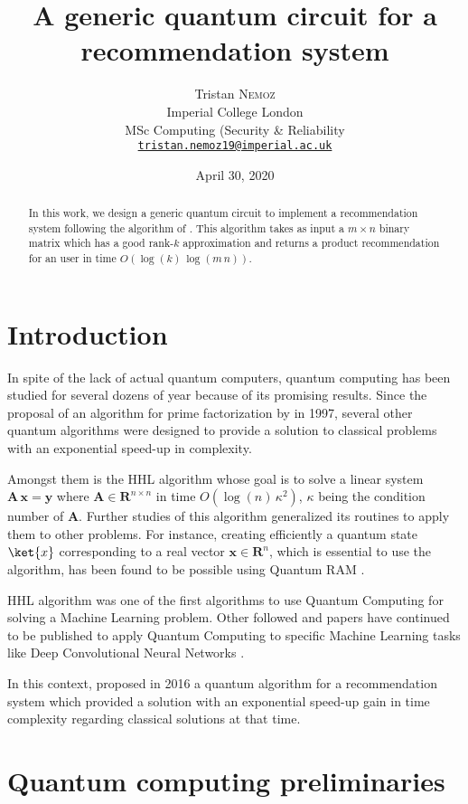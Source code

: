 \documentclass[11pt, a4paper]{article}
\date{April 30, 2020}
\author{Tristan \textsc{Nemoz}\\Imperial College London\\MSc Computing (Security \& Reliability\\\href{mailto:tristan.nemoz19@imperial.ac.uk}{\texttt{tristan.nemoz19@imperial.ac.uk}}}
\title{A generic quantum circuit for a recommendation system}
\begin{document}
	
	\maketitle
    \begin{abstract}
        In this work, we design a generic quantum circuit to implement a recommendation system following the algorithm of \citeauthor{QRS}. This algorithm takes as input a \(m\times n\) binary matrix which has a good rank-\(k\) approximation and returns a product recommendation for an user in time \(O(\log(k)\,\log(m\,n))\).
    \end{abstract}
    
    \section{Introduction}
        In spite of the lack of actual quantum computers, quantum computing has been studied for several dozens of year because of its promising results. Since the proposal of an algorithm for prime factorization \cite{Shor} by \citeauthor{Shor} in 1997, several other quantum algorithms were designed to provide a solution to classical problems with an exponential speed-up in complexity.
        
        Amongst them is the HHL algorithm \cite{HHL} whose goal is to solve a linear system \(\mathbf{A}\,\mathbf{x}=\mathbf{y}\) where \(\mathbf{A}\in\mathbf{R}^{n\times n}\) in time \(O\left(\log(n)\,\kappa^2\right)\), \(\kappa\) being the condition number of \(\mathbf{A}\). Further studies of this algorithm generalized its routines to apply them to other problems. For instance, creating efficiently a quantum state \(\ket{x}\) corresponding to a real vector \(\mathbf{x}\in\mathbf{R}^n\), which is essential to use the algorithm, has been found to be possible using Quantum RAM \cite{Prakash, QRAM, QRAMCircuit}.
        
        HHL algorithm was one of the first algorithms to use Quantum Computing for solving a Machine Learning problem. Other followed and papers have continued to be published to apply Quantum Computing to specific Machine Learning tasks like Deep Convolutional Neural Networks \cite{QCNN}.
        
        In this context, \citeauthor{QRS} proposed in 2016 a quantum algorithm for a recommendation system which provided a solution with an exponential speed-up gain in time complexity regarding classical solutions at that time.
    \section{Quantum computing preliminaries}
\end{document}
